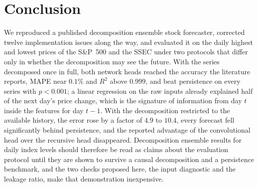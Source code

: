 \documentclass[pdflatex,sn-mathphys-num]{sn-jnl}%
\theoremstyle{thmstyleone}%
\theoremstyle{thmstyletwo}%
\theoremstyle{thmstylethree}%
\begin{document}
\section{Conclusion}\label{sec:conclusion}
We reproduced a published decomposition ensemble stock forecaster, corrected
twelve implementation issues along the way, and evaluated it on the daily
highest and lowest prices of the S\&P~500 and the SSEC under two protocols that
differ only in whether the decomposition may see the future. With the series
decomposed once in full, both network heads reached the accuracy the
literature reports, MAPE near $0.1\%$ and $R^2$ above $0.999$, and beat
persistence on every series with $p<0.001$; a linear regression on the raw
inputs already explained half of the next day's price change, which is the
signature of information from day $t$ inside the features for day $t-1$. With
the decomposition restricted to the available history, the error rose by a
factor of $4.9$ to $10.4$, every forecast fell significantly behind
persistence, and the reported advantage of the convolutional head over the
recursive head disappeared. Decomposition ensemble results for daily index
levels should therefore be read as claims about the evaluation protocol until
they are shown to survive a causal decomposition and a persistence benchmark,
and the two checks proposed here, the input diagnostic and the leakage ratio,
make that demonstration inexpensive.

\backmatter
\end{document}
